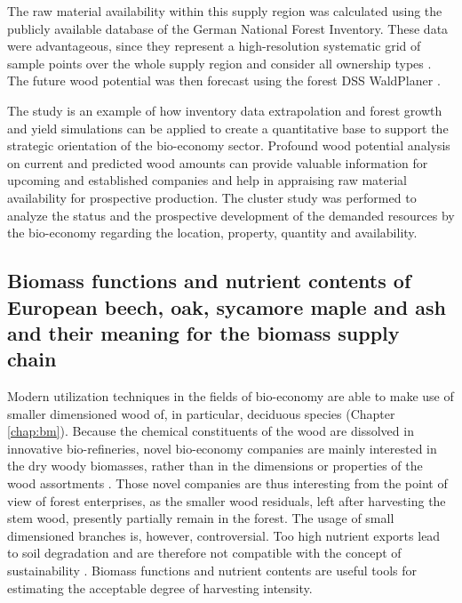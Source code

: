 The raw material availability within this supply region was calculated using the publicly available database of the German National Forest Inventory. These data were advantageous, since they represent a high-resolution systematic grid of sample points over the whole supply region and consider all ownership types \citep{schmitz_2008}. The future wood potential was then forecast using the forest DSS WaldPlaner \citep{hansen_2014}.

The study is an example of how inventory data extrapolation and forest growth and yield simulations can be applied to create a quantitative base to support the strategic orientation of the bio-economy sector. Profound wood potential analysis on current and predicted wood amounts can provide valuable information for upcoming and established companies and help in appraising raw material availability for prospective production. The cluster study was performed to analyze the status and the prospective development of the demanded resources by the bio-economy regarding the location, property, quantity and availability.

\subsection{Biomass functions and nutrient contents of European beech, oak, sycamore maple and ash and their meaning for the biomass supply chain}
\label{subsec:intro:struct:bm}
Modern utilization techniques in the fields of bio-economy are able to make use of smaller dimensioned wood of, in particular, deciduous species (Chapter \ref{chap:bm}). Because the chemical constituents of the wood are dissolved in innovative bio-refineries, novel bio-economy companies are mainly interested in the dry woody biomasses, rather than in the dimensions or properties of the wood assortments \citep{ekman_2013}. Those novel companies are thus interesting from the point of view of forest enterprises, as the smaller wood residuals, left after harvesting the stem wood, presently partially remain in the forest. The usage of small dimensioned branches is, however, controversial. Too high nutrient exports lead to soil degradation and are therefore not compatible with the concept of sustainability \citep[p. 261]{pretzsch_2014}. Biomass functions and nutrient contents are useful tools for estimating the acceptable degree of harvesting intensity.

